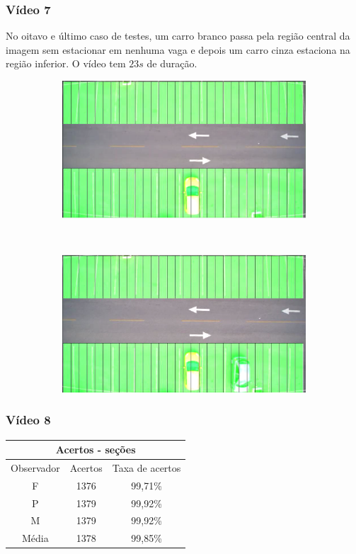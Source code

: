 \documentclass{beamer}
\begin{document}
\begin{frame}
\frametitle{Vídeo 7}
No oitavo e último caso de testes, um carro branco passa pela região central da imagem sem estacionar em nenhuma vaga e depois um carro cinza estaciona na região inferior. O vídeo tem $23s$ de duração.

\begin{figure}
\centering
\begin{subfigure}{.5\textwidth}
\centering
\includegraphics[width=.5\linewidth]{Video8Inicio}
\end{subfigure}\
\begin{subfigure}{.5\textwidth}
\centering
\includegraphics[width=.5\linewidth]{Video8Fim}
\end{subfigure}
\centering
\end{figure}	
\end{frame}

\begin{frame}
	\frametitle{Vídeo 8}
\begin{center}
\begin{tabular}{|c||c||c|}
\hline
\multicolumn{3}{|c|}{Acertos - seções}  \\ \hline\hline
Observador & Acertos & Taxa de acertos \\ \hline
F & 1376 & 99,71\% \\  \hline
P & 1379 & 99,92\% \\ \hline
M & 1379 & 99,92\% \\ \hline
Média & 1378 & 99,85\% \\
\hline
\end{tabular}
\end{center}
\end{frame}
\end{document}
